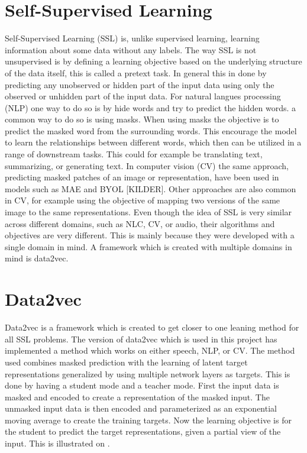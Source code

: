 \section{Self-Supervised Learning}
Self-Supervised Learning (SSL) is, unlike supervised learning, learning information about some data without any labels. The way SSL is not unsupervised is by defining a learning objective based on the underlying structure of the data itself, this is called a pretext task.
In general this in done by predicting any unobserved or hidden part of the input data using only the observed or unhidden part of the input data. 
For natural langues processing (NLP) one way to do so is by hide words and try to predict the hidden words. a common way to do so is using masks. When using masks the objective is to predict the masked word from the surrounding words. This encourage the model to learn the relationships between different words, which then can be utilized in a range of downstream tasks. This could for example be translating text, summarizing, or generating text. 
In computer vision (CV) the same approach, predicting masked patches of an image or representation, have been used in models such as MAE and BYOL [KILDER]. Other approaches are also common in CV, for example using the objective of mapping two versions of the same image to the same representations.
Even though the idea of SSL is very similar across different domains, such as NLC, CV, or audio, their algorithms and objectives are very different. This is mainly because they were developed with a single domain in mind. A framework which is created with multiple domains in mind is data2vec.


\section{Data2vec}
Data2vec is a framework which is created to get closer to one leaning method for all SSL problems. The version of data2vec which is used in this project has implemented a method which works on either speech, NLP, or CV. The method used combines masked prediction with the learning of latent target representations generalized by using multiple network layers as targets. This is done by having a student mode and a teacher mode. First the input data is masked and encoded to create a representation of the masked input. The unmasked input data is then encoded and parameterized as an exponential moving average to create the training targets. Now the learning objective is for the student to predict the target representations, given a partial view of the input. This is illustrated on .

